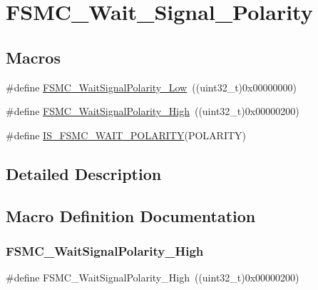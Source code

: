 \hypertarget{group___f_s_m_c___wait___signal___polarity}{}\section{F\+S\+M\+C\+\_\+\+Wait\+\_\+\+Signal\+\_\+\+Polarity}
\label{group___f_s_m_c___wait___signal___polarity}
\subsection*{Macros}
\begin{DoxyCompactItemize}
\item 
\#define \mbox{\hyperlink{group___f_s_m_c___wait___signal___polarity_ga7dc72fdfc6225e5daa9b8efee8dff49f}{F\+S\+M\+C\+\_\+\+Wait\+Signal\+Polarity\+\_\+\+Low}}~((uint32\+\_\+t)0x00000000)
\item 
\#define \mbox{\hyperlink{group___f_s_m_c___wait___signal___polarity_ga3418f29249a261edb1359d1bcdc43661}{F\+S\+M\+C\+\_\+\+Wait\+Signal\+Polarity\+\_\+\+High}}~((uint32\+\_\+t)0x00000200)
\item 
\#define \mbox{\hyperlink{group___f_s_m_c___wait___signal___polarity_gabc5321807d5184fe5cdb7848e1be7bc6}{I\+S\+\_\+\+F\+S\+M\+C\+\_\+\+W\+A\+I\+T\+\_\+\+P\+O\+L\+A\+R\+I\+TY}}(P\+O\+L\+A\+R\+I\+TY)
\end{DoxyCompactItemize}


\subsection{Detailed Description}


\subsection{Macro Definition Documentation}
\mbox{\label{group___f_s_m_c___wait___signal___polarity_ga3418f29249a261edb1359d1bcdc43661}} 
\subsubsection{\texorpdfstring{FSMC\_WaitSignalPolarity\_High}{FSMC\_WaitSignalPolarity\_High}}
{\footnotesize\ttfamily \#define F\+S\+M\+C\+\_\+\+Wait\+Signal\+Polarity\+\_\+\+High~((uint32\+\_\+t)0x00000200)}


